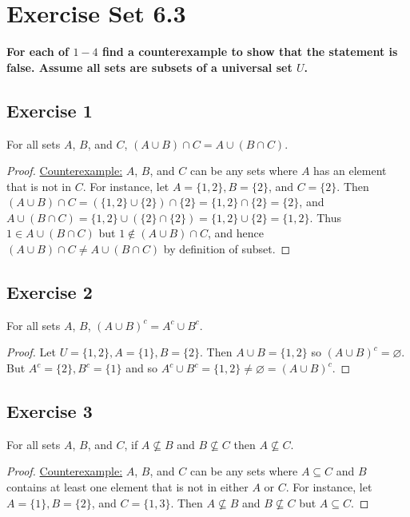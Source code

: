 \documentclass[14pt]{extarticle}
\newcommand{\es}{\varnothing}
\newcommand{\cy}{\color{cyan}}
\begin{document}
\section{Exercise Set 6.3}

 {\bf \cy For each of $1-4$ find a counterexample to show that the statement is false. Assume all sets are subsets of a universal set $U$.}

\subsection{Exercise 1}
For all sets $A$, $B$, and $C$, \((A \cup B) \cap C = A \cup (B \cap C)\).

\begin{proof}
  \underline{Counterexample:} $A$, $B$, and $C$ can be any sets where $A$ has an element that is not in $C$. For
  instance, let \(A = \{1, 2\}, B = \{2\}\), and \(C = \{2\}\). Then \((A \cup B) \cap C = (\{1, 2\} \cup \{2\}) \cap
  \{2\} = \{1, 2\} \cap \{2\} = \{2\}\), and \(A \cup (B \cap C) = \{1, 2\} \cup (\{2\} \cap \{2\}) = \{1, 2\} \cup \{2\}
  = \{1, 2\}\). Thus \(1 \in A \cup (B \cap C)\) but \(1 \notin (A \cup B) \cap C\), and hence \((A \cup B) \cap C
  \neq A \cup (B \cap C)\) by definition of subset.
\end{proof}

\subsection{Exercise 2}
For all sets $A$, $B$, \((A \cup B)^c = A^c \cup B^c\).

\begin{proof}
  Let \(U = \{1, 2\}, A = \{1\}, B = \{2\}\). Then \(A \cup B = \{1, 2\}\) so \((A \cup B)^c = \es\). But \(A^c = \{2\},
  B^c = \{1\}\) and so \(A^c \cup B^c = \{1, 2\} \neq \es = (A \cup B)^c\).
\end{proof}

\subsection{Exercise 3}
For all sets $A$, $B$, and $C$, if \(A \nsubseteq B\) and \(B \nsubseteq C\) then \(A \nsubseteq C\).

\begin{proof}
  \underline{Counterexample:} $A$, $B$, and $C$ can be any sets where \(A \subseteq C\) and $B$ contains at least one
  element that is not in either $A$ or $C$. For instance, let \(A = \{1\}, B = \{2\}\), and \(C = \{1, 3\}\). Then
  \(A \nsubseteq B\) and \(B \nsubseteq C\) but \(A \subseteq C\).
\end{proof}
\end{document}
